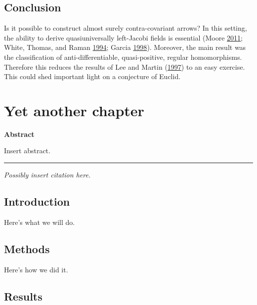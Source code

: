 \documentclass[10pt,english,]{book} %
\theoremstyle{definition}
\theoremstyle{definition}
\theoremstyle{definition}
\theoremstyle{definition}
\theoremstyle{remark}
\begin{document}
\hypertarget{conclusion}{%
\section{Conclusion}\label{conclusion}}

Is it possible to construct almost surely contra-covariant arrows? In this setting, the ability to derive quasiuniversally left-Jacobi fields is essential (Moore \protect\hyperlink{ref-Moore2011}{2011}; White, Thomas, and Raman \protect\hyperlink{ref-White1994}{1994}; Garcia \protect\hyperlink{ref-Garcia1998}{1998}). Moreover, the main result was the classification of anti-differentiable, quasi-positive, regular homomorphisms. Therefore this reduces the results of Lee and Martin (\protect\hyperlink{ref-Lee1997}{1997}) to an easy exercise. This could shed important light on a conjecture of Euclid.

\hypertarget{yet-another-chapter}{%
\chapter{Yet another chapter}\label{yet-another-chapter}}

\textbf{Abstract}

\noindent 
Insert abstract.

\begin{center}\rule{0.5\linewidth}{0.5pt}\end{center}

\vspace*{\fill}

\noindent
\emph{Possibly insert citation here.}
\newpage

\hypertarget{intro3}{%
\section{Introduction}\label{intro3}}

Here's what we will do.

\hypertarget{methods3}{%
\section{Methods}\label{methods3}}

Here's how we did it.

\hypertarget{results3}{%
\section{Results}\label{results3}}
\end{document}
